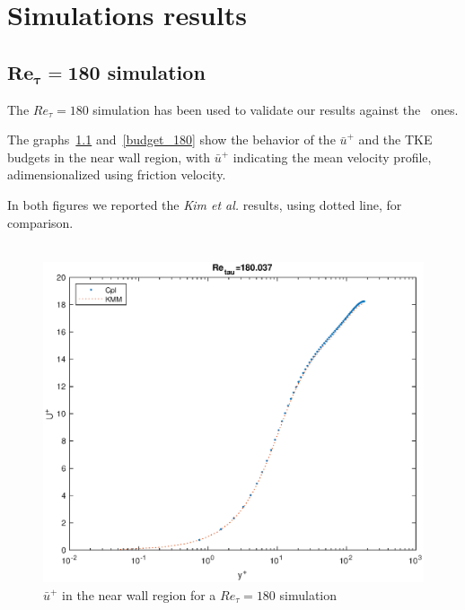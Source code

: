 \chapter{Simulations results}
\section{$\mathbf{Re_{\tau}=180}$ simulation}

The $Re_{\tau}=180$ simulation has been used to validate our results against the~\cite{kim_moin_moser} ones. \par
The graphs~\ref{loglaw_180} and~\ref{budget_180} show the behavior of the $\bar{u}^{+}$ and the TKE budgets in the near wall region, with $\bar{u}^{+}$ indicating the mean velocity profile, adimensionalized using friction velocity. \par
In both figures we reported the \emph{Kim et al.} results, using dotted line, for comparison. \\~\par

\begin{figure}
\begin{center}
\includegraphics[scale=0.55]{grafici/loglaw_180.eps}
\caption{$\bar{u}^{+}$ in the near wall region for a $Re_{\tau}=180$ simulation}
\label{loglaw_180}
\end{center} 
\end{figure}


